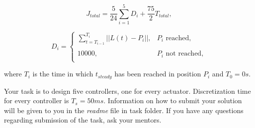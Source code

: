 \documentclass{article}
\begin{document}
	\begin{equation} \label{eq:total_cost}
	J_{total} = \frac{5}{24}\sum_{i=1}^{5} D_i + \frac{75}{2} T_{total},
	\end{equation}
	
	\begin{equation} \label{eq:distance_cost}
	D_i = \left\{
	\begin{array}{ll}
	\sum_{t=T_{i-1}}^{T_{i}} ||L(t) - P_i||, &  P_i \textrm{ reached}, \\
	& \\
	10000, &  P_i \textrm{ not reached},\\
	\end{array} 
	\right.
	\end{equation}
	
	\noindent
	where $T_i$ is the time in which $t_{steady}$ has been reached in position $P_i$ and $T_0 = 0s$.
	
	\vspace{10pt}
	\noindent
	Your task is to design five controllers, one for every actuator. Discretization time for every controller is $T_s = 50ms$. Information on how to submit your solution will be given to you in the \textit{readme} file in task folder. If you have any questions regarding submission of the task, ask your mentors.
	
\end{document}
